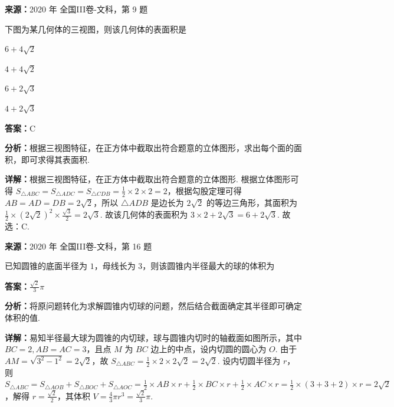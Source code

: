\begin{question}[points=5]
\textbf{来源：}2020 年 全国III卷-文科，第 9 题\par
下图为某几何体的三视图，则该几何体的表面积是
\begin{choices}
  \item $6+4\sqrt{2}$
  \item $4+4\sqrt{2}$
  \item $6+2\sqrt{3}$
  \item $4+2\sqrt{3}$
\end{choices}
\begin{solution}
\textbf{答案：}C

\textbf{分析：}根据三视图特征，在正方体中截取出符合题意的立体图形，求出每个面的面积，即可求得其表面积.

\textbf{详解：}根据三视图特征，在正方体中截取出符合题意的立体图形. 根据立体图形可得 $S_{\triangle ABC}=S_{\triangle ADC}=S_{\triangle CDB}=\frac{1}{2}\times2\times2=2$，根据勾股定理可得 $AB=AD=DB=2\sqrt{2}$，所以 $\triangle ADB$ 是边长为 $2\sqrt{2}$ 的等边三角形，其面积为 $\frac{1}{2}\times(2\sqrt{2})^2\times\frac{\sqrt{3}}{2}=2\sqrt{3}$. 故该几何体的表面积为 $3\times2+2\sqrt{3}=6+2\sqrt{3}$. 故选：C.
\end{solution}
\end{question}

\begin{question}[points=5]
\textbf{来源：}2020 年 全国III卷-文科，第 16 题\par
已知圆锥的底面半径为 $1$，母线长为 $3$，则该圆锥内半径最大的球的体积为
\begin{solution}
\textbf{答案：}$\frac{\sqrt{2}}{3}\pi$

\textbf{分析：}将原问题转化为求解圆锥内切球的问题，然后结合截面确定其半径即可确定体积的值.

\textbf{详解：}易知半径最大球为圆锥的内切球，球与圆锥内切时的轴截面如图所示，其中 $BC=2,AB=AC=3$，且点 $M$ 为 $BC$ 边上的中点，设内切圆的圆心为 $O$. 由于 $AM=\sqrt{3^2-1^2}=2\sqrt{2}$，故 $S_{\triangle ABC}=\frac{1}{2}\times2\times2\sqrt{2}=2\sqrt{2}$. 设内切圆半径为 $r$，则 $S_{\triangle ABC}=S_{\triangle AOB}+S_{\triangle BOC}+S_{\triangle AOC}=\frac{1}{2}\times AB\times r+\frac{1}{2}\times BC\times r+\frac{1}{2}\times AC\times r=\frac{1}{2}\times(3+3+2)\times r=2\sqrt{2}$，解得 $r=\frac{\sqrt{2}}{2}$，其体积 $V=\frac{4}{3}\pi r^3=\frac{\sqrt{2}}{3}\pi$.
\end{solution}
\end{question}

